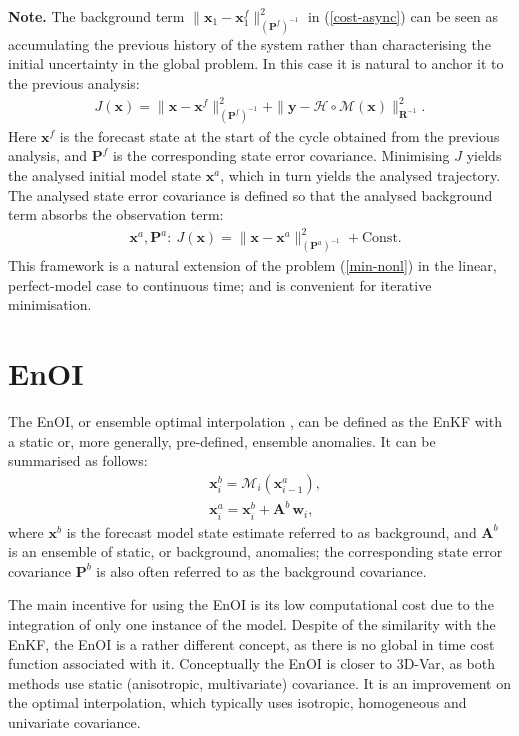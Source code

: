\documentclass[11pt]{report}
\newcommand{\mb} {\mathbf}
\begin{document}
{
  \setlength{\abovedisplayskip}{2pt}
  \setlength{\belowdisplayskip}{2pt}
  \scriptsize
  {\bf Note.} The background term $\|\mb x_1 - \mb x_1^f\|^2_{(\mb P^f)^{-1}}$ in (\ref{cost-async}) can be seen as accumulating the previous history of the system rather than characterising the initial uncertainty in the global problem.
  In this case it is natural to anchor it to the previous analysis:
  \begin{align}
    J(\mb x) = \|\mb x - \mb x^f\|^2_{(\mb P^f)^{-1}} + \|\mb y - \mathcal H \circ \mathcal M(\mb x)\|^2_{\mb R^{-1}}.
  \end{align}
  Here $\mb x^f$ is the forecast state at the start of the cycle obtained from the previous analysis, and $\mb P^f$ is the corresponding state error covariance.
  Minimising $J$ yields the analysed initial model state $\mb x^a$, which in turn yields the analysed trajectory.
  The analysed state error covariance is defined so that the analysed background term absorbs the observation term:
  \begin{align*}
    &\mb x^a, \mb P^a: \ J(\mb x) = \|\mb x - \mb x^a\|^2_{(\mb P^a)^{-1}} + \mathrm{Const}.
  \end{align*}
  This framework is a natural extension of the problem (\ref{min-nonl}) in the linear, perfect-model case to continuous time; and is convenient for iterative minimisation.\par
}

\section{EnOI}

The EnOI, or ensemble optimal interpolation \citep{eve03a}, can be defined as the EnKF with a static or, more generally, pre-defined, ensemble anomalies.
It can be summarised as follows:
\begin{align}
  \label{enoi-for}
  & \mb x^b_i = \mathcal M_i(\mb x^a_{i-1}),\\
  & \mb x^a_i = \mb x^b_i + \mb A^b \, \mb w_i,
\end{align}
where $\mb x^b$ is the forecast model state estimate referred to as background, and $\mb A^b$ is an ensemble of static, or background, anomalies; the corresponding state error covariance $\mb P^b$ is also often referred to as the background covariance.

The main incentive for using the EnOI is its low computational cost due to the integration of only one instance of the model.
Despite of the similarity with the EnKF, the EnOI is a rather different concept, as there is no global in time cost function associated with it.
Conceptually the EnOI is closer to 3D-Var, as both methods use static (anisotropic, multivariate) covariance.
It is an improvement on the optimal interpolation, which typically uses isotropic, homogeneous and univariate covariance.
\end{document}
